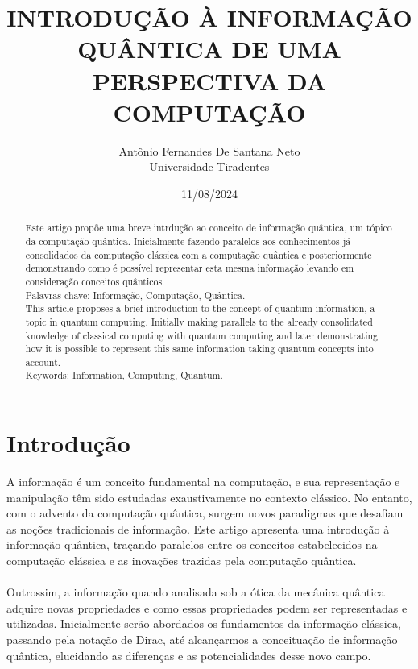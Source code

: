 \documentclass[11pt]{article}
\title{INTRODUÇÃO À INFORMAÇÃO QUÂNTICA DE UMA PERSPECTIVA DA COMPUTAÇÃO}
\author{Antônio Fernandes De Santana Neto \\ Universidade Tiradentes}
\date{11/08/2024}
\begin{document}
\maketitle
\begin{abstract}
Este artigo propõe uma breve intrdução ao conceito de informação quântica, um tópico da computação quântica. Inicialmente fazendo paralelos aos conhecimentos já consolidados da computação clássica com a computação quântica e posteriormente demonstrando como é possível representar esta mesma informação levando em consideração conceitos quânticos.\\
Palavras chave: Informação, Computação, Quântica. \\

This article proposes a brief introduction to the concept of quantum information, a topic in quantum computing. Initially making parallels to the already consolidated knowledge of classical computing with quantum computing and later demonstrating how it is possible to represent this same information taking quantum concepts into account.\\
Keywords: Information, Computing, Quantum.\\
\end{abstract}

\maketitle
\section{Introdução}
A informação é um conceito fundamental na computação, e sua representação e manipulação têm sido estudadas exaustivamente no contexto clássico. No entanto, com o advento da computação quântica, surgem novos paradigmas que desafiam as noções tradicionais de informação. Este artigo apresenta uma introdução à informação quântica, traçando paralelos entre os conceitos estabelecidos na computação clássica e as inovações trazidas pela computação quântica. \\ \\
Outrossim, a informação quando analisada sob a ótica da mecânica quântica adquire novas propriedades e como essas propriedades podem ser representadas e utilizadas. Inicialmente serão abordados os fundamentos da informação clássica, passando pela notação de Dirac, até alcançarmos a conceituação de informação quântica, elucidando as diferenças e as potencialidades desse novo campo.
\end{document}
